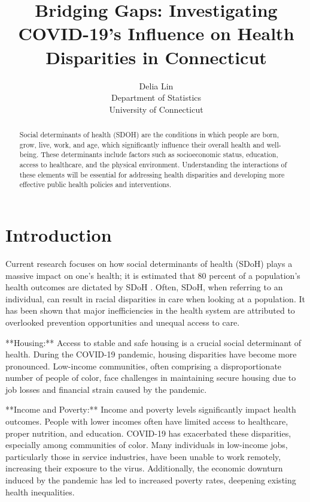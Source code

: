 \documentclass[12pt]{article}
\title{Bridging Gaps: Investigating COVID-19's Influence on Health Disparities in Connecticut}
\author{Delia Lin\\
  Department of Statistics\\
  University of Connecticut
}
\begin{document}
\maketitle


\begin{abstract}
    Social determinants of health (SDOH) are the conditions in which people are born, 
    grow, live, work, and age, which significantly influence their overall health and 
    well-being. These determinants include factors such as socioeconomic status, education, 
    access to healthcare, and the physical environment. Understanding the interactions of 
    these elements will be essential for addressing health disparities and developing more 
    effective public health policies and interventions.  
\end{abstract}

\section{Introduction}\label{sec:intro}


Current research focuses on how social determinants of health (SDoH) plays a  massive
impact on one's health; it is estimated that 80 percent of a population's health outcomes are 
dictated by SDoH \citep{HOOD2016129}. Often, SDoH, when referring to an individual, can result in racial 
disparities in care when looking at a population\citep{Monroe2023-uq}. It has been shown that major inefficiencies
in the health system are attributed to overlooked prevention opportunities and unequal access
to care.\citep{Allin2014-xn}

**Housing:**
Access to stable and safe housing is a crucial social determinant of health. During the COVID-19 pandemic, 
housing disparities have become more pronounced. Low-income communities, often comprising a disproportionate 
number of people of color, face challenges in maintaining secure housing due to job losses and financial strain 
caused by the pandemic. 


**Income and Poverty:**
Income and poverty levels significantly impact health outcomes. People with lower incomes often have limited 
access to healthcare, proper nutrition, and education. COVID-19 has exacerbated these disparities, especially 
among communities of color. Many individuals in low-income jobs, particularly those in service industries, have 
been unable to work remotely, increasing their exposure to the virus. Additionally, the economic downturn induced 
by the pandemic has led to increased poverty rates, deepening existing health inequalities.
\end{document}
